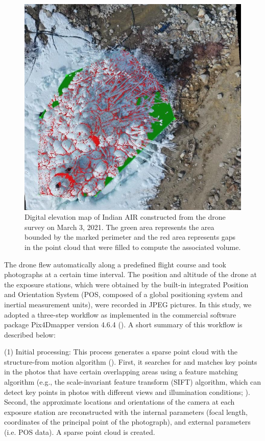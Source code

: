 \begin{figure}
	\begin{center}
		\includegraphics[width=12 cm]{figs/pix4d.jpg}
	\end{center}
	\caption{Digital elevation map of Indian AIR constructed from the drone survey on March 3, 2021. The green
		area represents the area bounded by the marked perimeter and the red area represents gaps in the point cloud
    that were filled to compute the associated volume.
	}
	\label{fig:DEM}
\end{figure}

The drone flew automatically along a predefined flight course and took photographs at a certain time interval. The
position and altitude of the drone at the exposure stations, which were obtained by the built-in integrated
Position and Orientation System (POS, composed of a global positioning system and inertial measurement units),
were recorded in JPEG pictures. In this study, we adopted a three-step workflow as implemented in the
commercial software package Pix4Dmapper version 4.6.4 (\cite{pix4dsaPix4DmapperUserManual2020}). A short summary of this workflow is
described below:

(1) Initial processing: This process generates a sparse point cloud with the structure-from motion algorithm
(\cite{turnerAutomatedTechniqueGenerating2012}). First, it searches for and matches key points in the photos that have certain overlapping
areas using a feature matching algorithm (e.g., the scale-invariant feature transform (SIFT) algorithm, which can
detect key points in photos with different views and illumination conditions;
\cite{loweDistinctiveImageFeatures2004}). Second, the approximate locations and orientations of the camera at
each exposure station are reconstructed with the internal parameters (focal length, coordinates of the principal
point of the photograph), and external parameters (i.e. POS data). A sparse point cloud is created.

